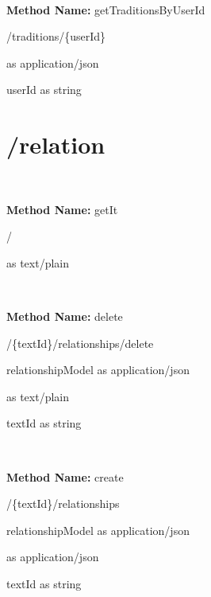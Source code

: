 \

\textbf{Method Name: }getTraditionsByUserId
\begin{get}
/traditions/\{userId\}
\end{get}

\begin{response}
 as application/json
\end{response}

\begin{parameter}
userId as string
\end{parameter}

\section{/relation}

\

\textbf{Method Name: }getIt
\begin{get}
/
\end{get}

\begin{response}
 as text/plain
\end{response}

\

\textbf{Method Name: }delete
\begin{post}
/\{textId\}/relationships/delete
\end{post}

\begin{request}
relationshipModel as application/json
\end{request}

\begin{response}
 as text/plain
\end{response}

\begin{parameter}
textId as string
\end{parameter}

\

\textbf{Method Name: }create
\begin{post}
/\{textId\}/relationships
\end{post}

\begin{request}
relationshipModel as application/json
\end{request}

\begin{response}
 as application/json
\end{response}

\begin{parameter}
textId as string
\end{parameter}

